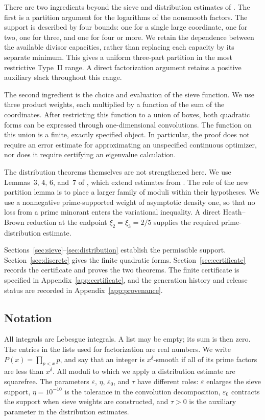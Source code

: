 \documentclass[11pt,reqno]{amsart}
\theoremstyle{definition}
\theoremstyle{remark}
\numberwithin{equation}{section}
\begin{document}
There are two ingredients beyond the sieve and distribution estimates
of \cite{Stadlmann26}. The first is a partition argument for the
logarithms of the nonsmooth factors. The support is described by four
bounds: one for a single large coordinate, one for two, one for three,
and one for four or more. We retain the dependence between the available
divisor capacities, rather than replacing each capacity by its separate
minimum. This gives a uniform three-part partition in the most
restrictive Type~II range. A direct factorization argument retains a
positive auxiliary slack throughout this range.

The second ingredient is the choice and evaluation of the sieve
function. We use three product weights, each multiplied by a function of
the sum of the coordinates. After restricting this function to a union
of boxes, both quadratic forms can be expressed through one-dimensional
convolutions. The function on this union is a finite, exactly specified
object. In particular, the proof does not require an error estimate for
approximating an unspecified continuous optimizer, nor does it require
certifying an eigenvalue calculation.

The distribution theorems themselves are not strengthened here. We use
Lemmas~3, 4, 6, and~7 of \cite{Stadlmann26}, which extend estimates from
\cite{BakerIrving,PolymathDistribution,Stadlmann25}. The role of the new
partition lemma is to place a larger family of moduli within their
hypotheses. We use a nonnegative prime-supported weight of asymptotic
density one, so that no loss from a prime minorant enters the variational
inequality.  A direct Heath--Brown reduction at the endpoint
$\xi_2=\xi_3=2/5$ supplies the required prime-distribution estimate.

Sections~\ref{sec:sieve}--\ref{sec:distribution} establish the permissible
support. Section~\ref{sec:discrete} gives the finite quadratic forms.
Section~\ref{sec:certificate} records the certificate and proves the two
theorems. The finite certificate is specified in Appendix~\ref{app:certificate},
and the generation history and release status are recorded in
Appendix~\ref{app:provenance}.

\subsection{Notation}
All integrals are Lebesgue integrals. A list may be empty; its sum is then
zero. The entries in the lists used for factorization are real numbers.
We write $P(x)=\prod_{p<x}p$, and say that an integer is $x^\delta$-smooth
if all of its prime factors are less than $x^\delta$. All moduli to which
we apply a distribution estimate are squarefree. The parameters
$\varepsilon$, $\eta$, $\varepsilon_0$, and $\tau$ have different roles:
$\varepsilon$ enlarges the sieve support, $\eta=10^{-10}$ is the tolerance
in the convolution decomposition, $\varepsilon_0$ contracts the support
when sieve weights are constructed, and $\tau>0$ is the auxiliary
parameter in the distribution estimates.
\end{document}
